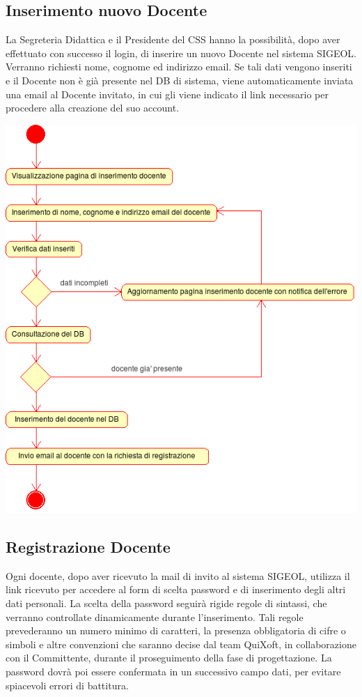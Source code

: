 \documentclass[11pt,a4paper]{article}
\begin{document}
\newpage
\subsection{Inserimento nuovo Docente}
La Segreteria Didattica e il Presidente del CSS hanno la possibilità, dopo aver effettuato con successo il login, di inserire un nuovo Docente nel sistema SIGEOL. Verranno richiesti nome, cognome ed indirizzo email. Se tali dati vengono inseriti e il Docente non è già presente nel DB di sistema, viene automaticamente inviata una email al Docente invitato, in cui gli viene indicato il link necessario per procedere alla creazione del suo account.
\begin{center}
 \includegraphics[scale=0.9]{images/inserimento_docente.png}
\end{center}

\newpage
\subsection{Registrazione Docente}
Ogni docente, dopo aver ricevuto la mail di invito al sistema SIGEOL, utilizza il link ricevuto per accedere al form di scelta password e di inserimento degli altri dati personali. La scelta della password seguirà rigide regole di sintassi, che verranno controllate dinamicamente durante l'inserimento. Tali regole prevederanno un numero minimo di caratteri, la presenza obbligatoria di cifre o simboli e altre convenzioni che saranno decise dal team QuiXoft, in collaborazione con il Committente, durante il proseguimento della fase di progettazione. La password dovrà poi essere confermata in un successivo campo dati, per evitare spiacevoli errori di battitura.
\end{document}
